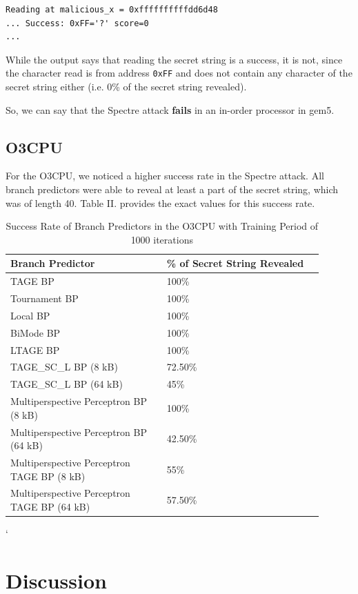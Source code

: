 \documentclass[twocolumn,showpacs,%
  nofootinbib,aps,superscriptaddress,%
  eqsecnum,prd,notitlepage,showkeys,10pt]{revtex4-1}
\begin{document}
\begin{verbatim}
Reading at malicious_x = 0xffffffffffdd6d48 
... Success: 0xFF='?' score=0
...
\end{verbatim}

While the output says that reading the secret string is a success, it is not, since the character read is from address \texttt{0xFF} and does not contain any character of the secret string either (i.e. 0\% of the secret string revealed).

So, we can say that the Spectre attack \textbf{fails} in an in-order processor in gem5.

\subsection{O3CPU}

For the O3CPU, we noticed a higher success rate in the Spectre attack. All branch predictors were able to reveal at least a part of the secret string, which was of length 40. Table II. provides the exact values for this success rate.

\begin{table}
\centering
\caption{Success Rate of Branch Predictors in the O3CPU with Training Period of 1000 iterations}
\small
\begin{tabular}{p{0.45\linewidth}p{0.45\linewidth}}
\hline
Branch Predictor & \% of Secret String Revealed \\
\hline
TAGE BP & 100\% \\
Tournament BP & 100\% \\
Local BP & 100\% \\
BiMode BP & 100\% \\
LTAGE BP & 100\% \\
TAGE\_SC\_L BP (8 kB) & 72.50\% \\
TAGE\_SC\_L BP (64 kB) & 45\% \\
Multiperspective Perceptron BP (8 kB) & 100\% \\
Multiperspective Perceptron BP (64 kB) & 42.50\% \\
Multiperspective Perceptron TAGE BP (8 kB) & 55\% \\
Multiperspective Perceptron TAGE BP (64 kB) & 57.50\% \\
\hline
\end{tabular}
\end{table}
`

\section{Discussion}
\end{document}

